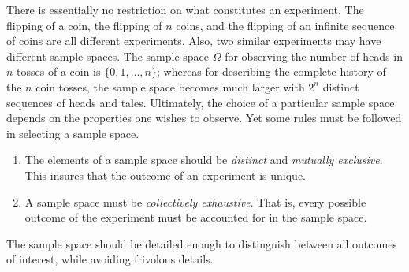 There is essentially no restriction on what constitutes an experiment.
The flipping of a coin, the flipping of $n$ coins, and the flipping of an infinite sequence of coins are all different experiments.
Also, two similar experiments may have different sample spaces.
The sample space $\Omega$ for observing the number of heads in $n$ tosses of a coin is $\{ 0, 1, \ldots, n \}$; whereas for describing the complete history of the $n$ coin tosses, the sample space becomes much larger with $2^n$ distinct sequences of heads and tales.
Ultimately, the choice of a particular sample space depends on the properties one wishes to observe.
Yet some rules must be followed in selecting a sample space.
\begin{enumerate}
\item The elements of a sample space should be \emph{distinct} and \emph{mutually exclusive}.
This insures that the outcome of an experiment is unique.
\item A sample space must be \emph{collectively exhaustive}.
That is, every possible outcome of the experiment must be accounted for in the sample space.
\end{enumerate}
The sample space should be detailed enough to distinguish between all outcomes of interest, while avoiding frivolous details.

